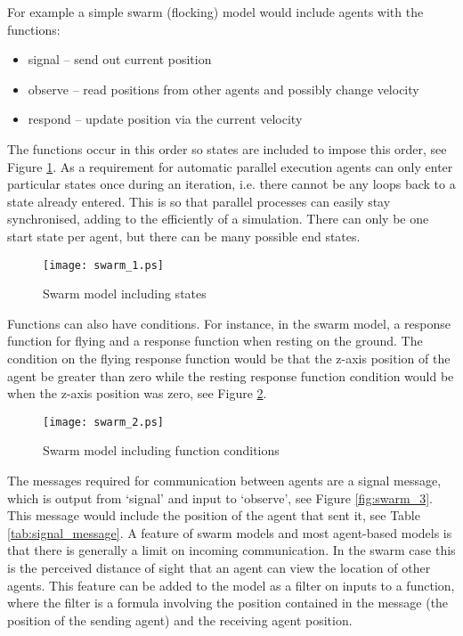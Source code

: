 For example a simple swarm (flocking) model would include agents with the
functions:

\begin{itemize}
\item signal -- send out current position
\item observe -- read positions from other agents and possibly change velocity
\item respond -- update position via the current velocity
\end{itemize}

The functions occur in this order so states are included to impose this
order, see Figure \ref{fig:swarm_1}. As a requirement for automatic parallel
execution agents can only enter particular states once during an iteration,
i.e. there cannot be any loops back to a state already entered. This is so that
parallel processes can easily stay synchronised, adding to the efficiently of a
simulation. There can only be one start state per agent, but there can be many
possible end states.

\begin{figure}[ht]
\begin{center}
\texttt{[image: swarm\_1.ps]}
\caption{Swarm model including states}
\label{fig:swarm_1}
\end{center}
\end{figure}

Functions can also have conditions. For instance, in
the swarm model, a response function for flying and a response function when
resting on the ground. The condition on the flying response function would be that the
z-axis position of the agent be greater than zero while the resting response
function condition would be when the z-axis position was zero, see Figure
\ref{fig:swarm_2}.

\begin{figure}[ht]
\begin{center}
\texttt{[image: swarm\_2.ps]}
\caption{Swarm model including function conditions}
\label{fig:swarm_2}
\end{center}
\end{figure}

The messages required for communication between agents are a signal message,
which is output from `signal' and input to `observe', see Figure
\ref{fig:swarm_3}. This message would include the position of the agent that
sent it, see Table \ref{tab:signal_message}. A feature of swarm models and most
agent-based models is that there is generally a limit on incoming communication. In the swarm case this is the perceived distance of sight that an agent can view the location of other
agents. This feature can be added to the model as a filter on inputs to a
function, where the filter is a formula involving the position contained in the
message (the position of the sending agent) and the receiving agent position.

